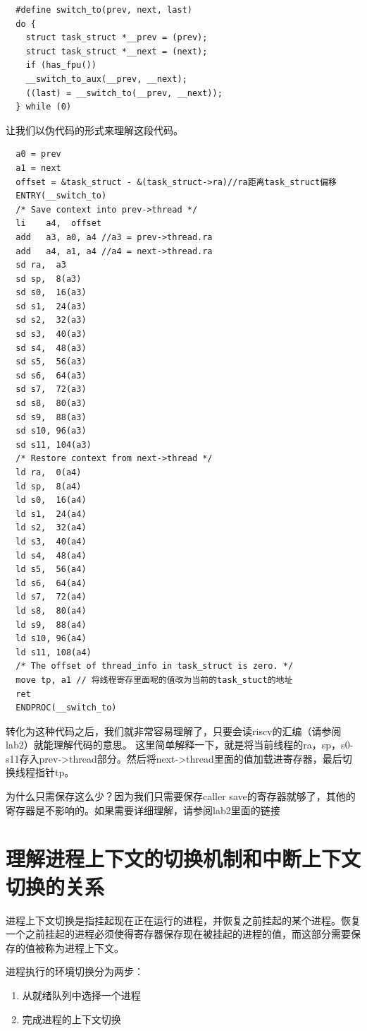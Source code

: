 \documentclass[lang=cn,10pt]{elegantbook}
\begin{document}
\begin{lstlisting}
  #define switch_to(prev, next, last)		
  do {						
    struct task_struct *__prev = (prev);	
    struct task_struct *__next = (next);	
    if (has_fpu())				
    __switch_to_aux(__prev, __next);	
    ((last) = __switch_to(__prev, __next));	
  } while (0)
\end{lstlisting}
让我们以伪代码的形式来理解这段代码。

\begin{lstlisting}
  a0 = prev
  a1 = next 
  offset = &task_struct - &(task_struct->ra)//ra距离task_struct偏移
  ENTRY(__switch_to)
  /* Save context into prev->thread */
  li    a4,  offset
  add   a3, a0, a4 //a3 = prev->thread.ra
  add   a4, a1, a4 //a4 = next->thread.ra
  sd ra,  a3 
  sd sp,  8(a3)
  sd s0,  16(a3)
  sd s1,  24(a3)
  sd s2,  32(a3)
  sd s3,  40(a3)
  sd s4,  48(a3)
  sd s5,  56(a3)
  sd s6,  64(a3)
  sd s7,  72(a3)
  sd s8,  80(a3)
  sd s9,  88(a3)
  sd s10, 96(a3)
  sd s11, 104(a3)
  /* Restore context from next->thread */
  ld ra,  0(a4)
  ld sp,  8(a4)
  ld s0,  16(a4)
  ld s1,  24(a4)
  ld s2,  32(a4)
  ld s3,  40(a4)
  ld s4,  48(a4)
  ld s5,  56(a4)
  ld s6,  64(a4)
  ld s7,  72(a4)
  ld s8,  80(a4)
  ld s9,  88(a4)
  ld s10, 96(a4)
  ld s11, 108(a4)
  /* The offset of thread_info in task_struct is zero. */
  move tp, a1 // 将线程寄存里面呢的值改为当前的task_stuct的地址
  ret
  ENDPROC(__switch_to)
\end{lstlisting}
转化为这种代码之后，我们就非常容易理解了，只要会读riscv的汇编（请参阅lab2）就能理解代码的意思。
这里简单解释一下，就是将当前线程的ra，sp，s0-s11存入prev->thread部分。然后将next->thread里面的值加载进寄存器，最后切换线程指针tp。

为什么只需保存这么少？因为我们只需要保存caller save的寄存器就够了，其他的寄存器是不影响的。如果需要详细理解，请参阅lab2里面的链接

\section{理解进程上下文的切换机制和中断上下文切换的关系}
进程上下文切换是指挂起现在正在运行的进程，并恢复之前挂起的某个进程。恢复一个之前挂起的进程必须使得寄存器保存现在被挂起的进程的值，而这部分需要保存的值被称为进程上下文。

进程执行的环境切换分为两步：
\begin{enumerate}
\item 从就绪队列中选择一个进程
\item 完成进程的上下文切换  
\end{enumerate}
\end{document}
